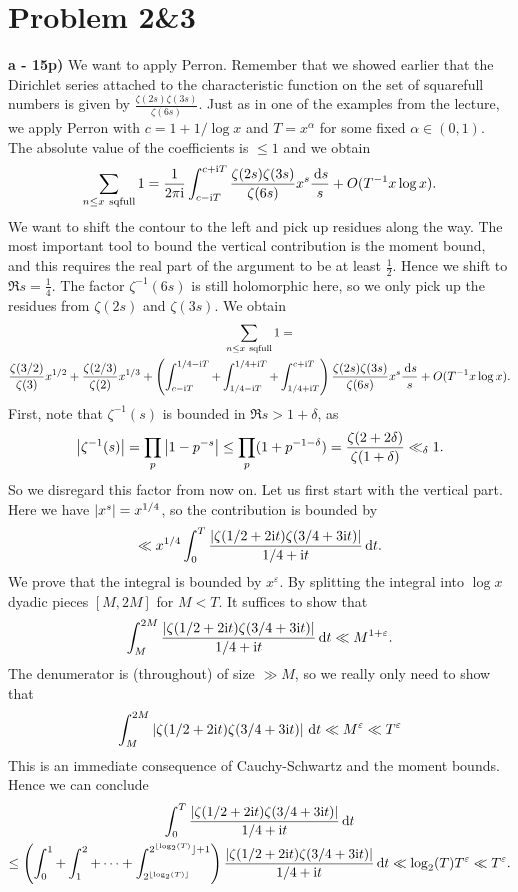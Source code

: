 \documentclass[a4paper,11pt]{article}
\begin{document}
\section*{Problem 2\&3}
\textbf{a - 15p)} We want to apply Perron. Remember that we showed earlier that
the Dirichlet series attached to the characteristic function on the set
of squarefull numbers is given by $\frac{\zeta(2s)\zeta(3s)}{\zeta(6s)}$. 
Just as in one of the examples from the lecture, we apply Perron with
$c = 1 + 1/\log x$ and $T = x^\alpha$ for some fixed $\alpha \in (0,1)$.
The absolute value of the coefficients is $\leq 1$ and we obtain
\[
    \sum_{n\leq x \  \rm sqfull} 1 
    = \frac{1}{2 \pi \mathrm i} \int_{c-\mathrm i T}^{c+\mathrm i T} \frac{\zeta(2s)\zeta(3s)}{\zeta(6s)}
    x^s \frac {\mathrm{\,d} s}s + O(T^{-1} x \log x).
\]
We want to shift the contour to the left and pick up residues along the way. 
The most important tool to bound the vertical contribution is the moment bound,
and this requires the real part of the argument to be at least $\frac 12$. 
Hence we shift to $\Re s = \frac 14$. The factor $\zeta^{-1}(6s)$ is still
holomorphic here, so we only pick up the residues from $\zeta(2s)$ and $\zeta(3s)$.
We obtain
\begin{multline*}
    \sum_{n \leq x \ \rm sqfull} 1  =  \\
    \frac{\zeta(3/2)}{\zeta(3)}x^{1/2} + \frac{\zeta(2/3)}{\zeta(2)} x^{1/3}
    + \left(\int_{c-\mathrm i T}^{1/4 - \mathrm i T} + \int_{1/4 - \mathrm i T}^{1/4 + \mathrm i T} 
    + \int_{1/4 + \mathrm i T}^{c + \mathrm i T}\right) \frac{\zeta(2s)\zeta(3s)}{\zeta(6s)}
    x^s \frac{\mathrm{\,d} s}{s} + O(T^{-1} x \log x).
\end{multline*}
First, note that $\zeta^{-1}(s)$ is bounded in $\Re s > 1+\delta$, as 
\[
    \left\lvert \zeta^{-1}(s)  \right\rvert = \prod_p \left\lvert 1-p^{-s} \right\rvert 
    \leq \prod_p (1 + p^{-1-\delta}) = \frac{\zeta(2+2\delta)}{\zeta(1+\delta)}
    \ll_\delta 1. 
\] 
So we disregard this factor from now on. Let us first start with the vertical part.
Here we have $\left\lvert x^s \right\rvert = x^{1/4}$, so the contribution is bounded by 
\[
    \ll x^{1/4} \int_0^T \frac{\left\lvert  \zeta(1/2 + 2 \mathrm i t)  \zeta(3/4 + 3 \mathrm i t) \right\rvert}
    {1/4 + \mathrm i t} \mathrm{\,d} t.
\]
We prove that the integral is bounded by $x^{\varepsilon}$. By splitting the integral
into $\log x$ dyadic pieces $[M, 2M]$ for $M < T$. It suffices to show that 
\[
    \int_M^{2M} \frac{\left\lvert \zeta(1/2 + 2 \mathrm i t)  \zeta(3/4 + 3 \mathrm i t) \right\rvert} {1/4 +
    \mathrm i t} \mathrm{\,d} t \ll M^{1+\varepsilon}.
\]
The denumerator is (throughout) of size $\gg M$, so we really only need to show
that 
\[
    \int_M^{2M} \left\lvert \zeta(1/2 + 2 \mathrm i t)  \zeta(3/4 + 3 \mathrm i t) \right\rvert \mathrm{\,d} t \ll 
    M^{\varepsilon} \ll T^\varepsilon 
\]
This is an immediate consequence of Cauchy-Schwartz and the moment bounds. 
Hence we can conclude
\begin{multline*}
\int_0^T \frac{\left\lvert  \zeta(1/2 + 2 \mathrm i t)  \zeta(3/4 + 3 \mathrm i t) \right\rvert}
    {1/4 + \mathrm i t} \mathrm{\,d} t  \\ \leq 
\left(\int_0^1 + \int_1^2 + \dots + \int_{2^{\lfloor \log_2(T) \rfloor}}^{2^{\lfloor \log_2(T)}\rfloor+1} \right)  \frac{\left\lvert  \zeta(1/2 + 2 \mathrm i t)  \zeta(3/4 + 3 \mathrm i t) \right\rvert}
    {1/4 + \mathrm i t} \mathrm{\,d} t  
    \ll \log_2(T) T^{\varepsilon} \ll T^{\varepsilon}.
\end{multline*}
\end{document}
